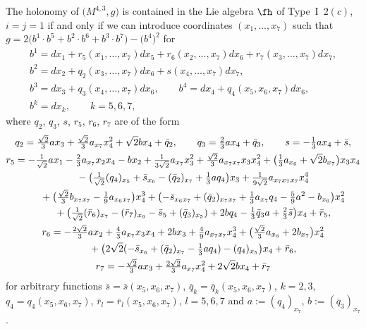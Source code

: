 \begin{Proposition} The holonomy of $\big(M^{4,3},g\big)$ is contained in the Lie algebra $\fh$ of Type~I~$2(c)$, $i=j=1$ if and only if we can introduce coordinates $(x_1,\dots, x_7)$ such that $g=2\big(b^1\cdot b^5+b^2\cdot b^6+b^3\cdot b^7\big)- \big(b^4\big)^2$ for
\begin{gather*}
b^1= dx_1 + r_5(x_1,\dots, x_7)dx_5+r_6(x_2,\dots,x_7)dx_6+r_7(x_3,\dots,x_7)dx_7, \\
b^2= dx_2+q_2(x_3,\dots,x_7)dx_6 +s(x_4,\dots,x_7)dx_7, \\
b^3= dx_3+q_3(x_4,\dots,x_7) dx_6, \qquad
b^4= dx_4+q_4(x_5,x_6,x_7)dx_6, \\
b^k= dx_k,\qquad k=5,6,7 ,
\end{gather*}
where $q_2$, $q_3$, $s$, $r_5$, $r_6$, $r_7$ are of the form
\begin{gather*}
q_2 = \tfrac {\sqrt2} 3ax_3+\tfrac {\sqrt2} 3 a_{ x_7}x_4^2 +\sqrt2 b x_4+\bar q_2,\qquad
q_3 = \tfrac 23 a x_4+\bar q_3,\qquad
s = -\tfrac13 a x_4+\bar s, \\
r_5 = -\tfrac 1{\sqrt 2} a x_1 -\tfrac 23 a_{x_7} x_2 x_4 -b x_2 +\tfrac 1{3\sqrt2} a_{x_7} x_3^2 +\tfrac{\sqrt2}3 a_{x_7 x_7 }x_3 x_4^2+\big( \tfrac13 a_{x_6} +\sqrt2 b_{x_7}\big) x_3 x_4 \\
\hphantom{r_5 =}{} -\big( \tfrac1{\sqrt2} (q_4)_{x_5} + \bar s_{x_6} - (\bar q_2)_{x_7} +\tfrac13 a q_4\big) x_3 +\tfrac1{9\sqrt2} a_{x_7 x_7 x_7} x_4^4 \\
\hphantom{r_5 =}{}+\big(\tfrac{\sqrt2}3 b_{x_7 x_7}-\tfrac19 a_{x_6 x_7}\big) x_4^3 +\big( {-}\bar s_{x_6 x_7}+(\bar q_2)_{x_7 x_7} +\tfrac13 a_{x_7}q_4 -\tfrac59 a^2 -b_{x_6}\big) x_4^2 \\
\hphantom{r_5 =}{} +\big( \tfrac1{\sqrt2} (\bar r_6)_{x_7}-(\bar r_7)_{x_6} -\bar s_5 +(\bar q_3)_{x_5}) +2b q_4 -\tfrac13 \bar q_3 a +\tfrac23 \bar s\big) x_4 +\bar r_5,\\
r_6=-\tfrac{2\sqrt2}3 a x_2 +\tfrac43 a_{x_7} x_3 x_4 +2b x_3 +\tfrac49 a_{x_7 x_7} x_4^3 +\big(\tfrac{\sqrt2}3 a_{x_6} +2b_{x_7}\big) x_4^2 \\
\hphantom{r_6=}{}+\big( 2\sqrt2 (-\bar s_{x_6} +(\bar q_2)_{x_7}-\tfrac13 a q_4) -(q_4)_{x_5}\big) x_4 + \bar r_6,\\
r_7=-\tfrac{\sqrt2}3 a x_3 +\tfrac{2\sqrt2}3 a_{x_7} x_4^2 +2\sqrt2 b x_4 +\bar r_7
\end{gather*}
for arbitrary functions $\bar s=\bar s(x_5,x_6,x_7)$, $\bar q_k=\bar q_k(x_5,x_6,x_7)$, $k=2,3$, $q_4=q_4(x_5,x_6,x_7)$, $\bar r_l=\bar r_l(x_5,x_6,x_7)$, $l=5,6,7$ and $a:= (q_4)_{x_7}$, $b:= (\bar q_3)_{x_7}$.
\end{Proposition}
